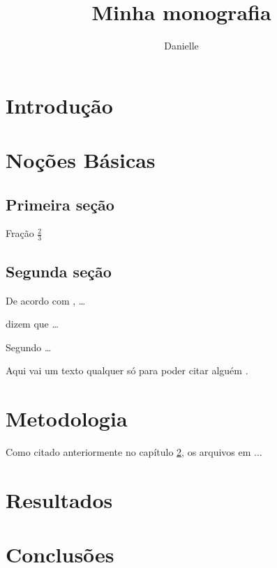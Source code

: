 \documentclass[12pt, openright, twoside, a4paper, portuguese]{abntex2}
\title{Minha monografia}
\author{Danielle}
\begin{document}
\maketitle

\chapter{Introdução} \label{cap:intro}

\chapter{Noções Básicas} \label{cap:basic}

\section{Primeira seção}

Fração $\frac{2}{3}$

\section{Segunda seção}


De acordo com , \ldots\

 dizem que \ldots\

Segundo  \ldots\

Aqui vai um texto qualquer só para poder citar alguém \cite[p.~402]{sammon1969nonlinear}.

\chapter{Metodologia} \label{cap:metod}

	Como citado anteriormente no capítulo \ref{cap:basic}, os arquivos em ...

\chapter{Resultados} \label{cap:result}

\chapter{Conclusões} \label{cap:concl}
 


\end{document}
